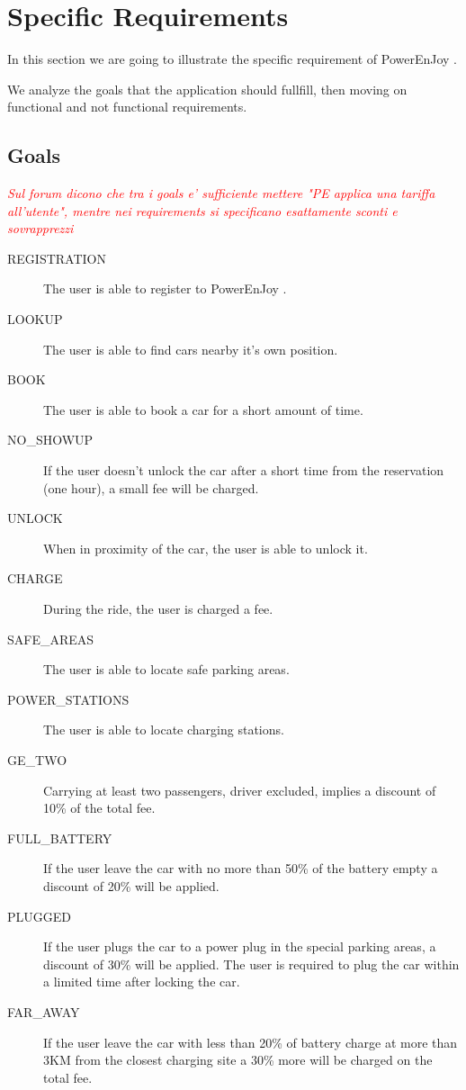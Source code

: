 \documentclass[11pt]{article} %
\newcommand{\pe}{PowerEnJoy }
\begin{document}
 




\newpage
\section{Specific Requirements}

In this section we are going to illustrate the specific requirement of \pe.

We analyze the goals that the application should fullfill, then moving on functional and not functional requirements.

 \subsection{Goals}

\textcolor{red}{ \textit{Sul forum dicono che tra i goals e' sufficiente mettere "PE applica una tariffa all'utente", mentre nei requirements si specificano esattamente sconti e sovrapprezzi} }
 
 \begin{description}
 	\item[REGISTRATION] The user is able to register to \pe.
 	\item[LOOKUP] The user is able to find cars nearby it's own position.
 	\item[BOOK] The user is able to book a car for a short amount of time.
 	\item[NO\_SHOWUP] If the user doesn't unlock the car after a short time from the reservation (one hour), a small fee will be charged.
 	\item[UNLOCK] When in proximity of the car, the user is able to unlock it.
 	\item[CHARGE] During the ride, the user is charged a fee.
 	\item[SAFE\_AREAS] The user is able to locate safe parking areas.
	\item[POWER\_STATIONS] The user is able to locate charging stations.
 	\item[GE\_TWO] Carrying at least two passengers, driver excluded, implies a discount of 10\% of the total fee.
 	\item[FULL\_BATTERY] If the user leave the car with no more than 50\% of the battery empty a discount of 20\% will be applied.
 	\item[PLUGGED] If the user plugs the car to a power plug in the special parking areas, a discount of 30\% will be applied. The user is required to plug the car within a limited time after locking the car.
 	\item[FAR\_AWAY] If the user leave the car with less than 20\% of battery charge at more than 3KM from the closest charging site a 30\% more will be charged on the total fee.

 \end{description}
\end{document}
